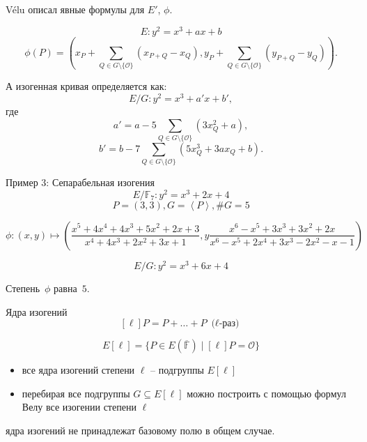 \documentclass{beamer}
\begin{document}
\begin{frame}
V\'{e}lu описал явные формулы для $E'$, $\phi$.

\[E: y^2 = x^3 + a x + b\]
\[
\phi(P)
=
\left(
  x_P + \sum_{Q \in G \setminus \{\mathcal{O}\}} \left( x_{P+Q} - x_Q \right),
  y_P + \sum_{Q \in G \setminus \{ \mathcal{O} \}} \left( y_{P+Q} - y_Q \right)
\right).
\]

А изогенная кривая определяется как:
\[E/G: y^2 = x^3 + a' x + b',\] где
\[
a' = a - 5 \sum_{Q \in G \setminus \{ \mathcal{O} \}} \left( 3 x_Q^2 + a \right),
\]
\[
b' = b - 7 \sum_{Q \in G \setminus \{\mathcal{O}\}} \left(
5 x_Q^3 + 3 a x_Q + b
\right).
\]
\end{frame}

\begin{frame}{Пример 3: Сепарабельная изогения}
	\[E/\mathbb{F}_{7}: y^2 = x^3 + 2 x + 4\]
	\[P  = (3,3), G = \left< P \right>, \#G = 5\]
	
	\begin{footnotesize}
	\[\phi: (x,y) \mapsto \left(
	\frac{x^5 + 4 x^4 + 4 x^3 + 5 x^2 + 2 x + 3}{x^4 + 4 x^3 + 2 x^2 + 3 x + 1},
	y\frac{x^6 - x^5 + 3 x^3 + 3 x^2 + 2 x}{x^6 - x^5 + 2 x^4 + 3 x^3 - 2 x^2 - x - 1} \right)
	\]
	\end{footnotesize}
	
	\[E/G: y^2 = x^3 + 6 x + 4\]
	\begin{center}
	Степень~$\phi$ равна~$5$.
	\end{center}
\end{frame}

\begin{frame}{Ядра изогений}
	\[
	[\ell] P = P + \ldots + P~\text{($\ell$-раз)}
	\]
	
	\[
	E[\ell] = \{ P \in E(\overline{\mathbb{F}}) \mid [\ell] P = \mathcal{O} \}
	\]
	
	\begin{itemize}
		\item все ядра изогений степени $\ell$ -- подгруппы $E[\ell]$
		\item перебирая все подгруппы $G  \subseteq E[\ell]$ можно построить с помощью формул Велу все изогении степени $\ell$
	\end{itemize}
	
	\vspace{1em}
	 ядра изогений не принадлежат базовому полю в общем случае.
\end{frame}
\end{document}
